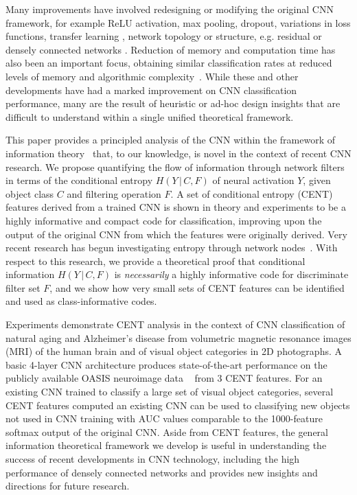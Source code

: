 \documentclass[10pt,onecolumn]{article}
\begin{document}
Many improvements have involved redesigning or modifying the original CNN framework, for example ReLU activation, max pooling, dropout, variations in loss functions, transfer learning \cite{oquab2014learning}, network topology or structure, e.g. residual \cite{he2016identity} or densely connected networks \cite{huang2016densely}. Reduction of memory and computation time has also been an important focus, obtaining similar classification rates at reduced levels of memory and algorithmic complexity~\cite{rastegari2016xnor,song2015learning}. %
While these and other developments have had a marked improvement on CNN classification performance, many are the result of heuristic or ad-hoc design insights that are difficult to understand within a single unified theoretical framework.

This paper provides a principled analysis of the CNN within the framework of information theory~\cite{shannon2001mathematical} that, to our knowledge, is novel in the context of recent CNN research. We propose quantifying the flow of information through network filters in terms of the conditional entropy $H(Y\, | \,C,F)$ of neural activation $Y$, given object class $C$ and filtering operation $F$. A set of conditional entropy (CENT) features derived from a trained CNN is shown in theory and experiments to be a highly informative and compact code for classification, improving upon the output of the original CNN from which the features were originally derived. Very recent research has begun investigating entropy through network nodes~\cite{shwartz2017opening,kuo2017data}. With respect to this research, we provide a theoretical proof that conditional information $H(Y\, | \,C,F)$ is {\em necessarily} a highly informative code for discriminate filter set $F$, and we show how very small sets of CENT features can be identified and used as class-informative codes.

Experiments demonstrate CENT analysis in the context of CNN classification of natural aging and Alzheimer's disease from volumetric magnetic resonance images (MRI) of the human brain and of visual object categories in 2D photographs. A basic 4-layer CNN architecture produces state-of-the-art performance on the publicly available OASIS neuroimage data ~\cite{marcus2007open} from 3 CENT features. For an existing CNN trained to classify a large set of visual object categories, several CENT features computed an existing CNN can be used to classifying new objects not used in CNN training with AUC values comparable to the 1000-feature softmax output of the original CNN. Aside from CENT features, the general information theoretical framework we develop is useful in understanding the success of recent developments in CNN technology, including the high performance of densely connected networks\cite{huang2016densely} and provides new insights and directions for future research.
\end{document}
